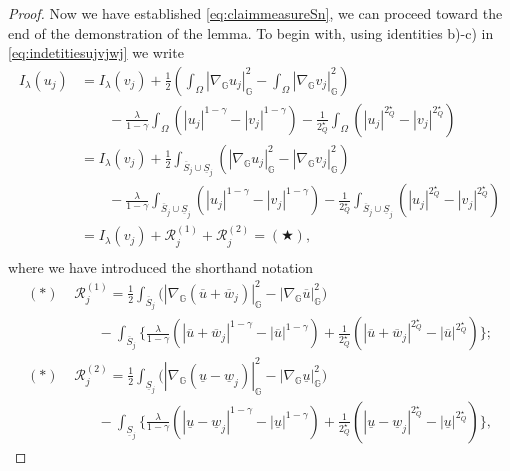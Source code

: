 \documentclass[11pt]{amsart}
\numberwithin{equation}{section} %
\theoremstyle{definition}
\begin{document}
\begin{proof}
	Now we have established \eqref{eq:claimmeasureSn}, we can proceed toward the end of the demonstration
	of the lemma.
	To begin with, using identities b)-c) in \eqref{eq:indetitiesujvjwj} we write
	\begin{align*}
		I_{\lambda}(u_j) & = I_{\lambda}(v_j)
		+ \frac{1}{2}\left(\int_{\Omega}|\nabla_{\mathbb{G}}u_j|_{\mathbb{G}}^2-\int_{\Omega}|\nabla_{\mathbb{G}}v_j|_{\mathbb{G}}^2\right) \\
		&\qquad-\frac{\lambda}{1-\gamma}\int_\Omega(|u_j|^{1-\gamma}-|v_j|^{1-\gamma}) 
		-\frac{1}{2^{\star}_{Q}}\int_\Omega(|u_j|^{2^{\star}_{Q}}-|v_j|^{2^{\star}_{Q}}) \\
		& = I_{\lambda}(v_j)
		+ \frac{1}{2}\int_{\overline{S}_j\cup\underline{S}_j}(|\nabla_{\mathbb{G}} u_j|_{\mathbb{G}}^2-|\nabla_{\mathbb{G}} v_j|_{\mathbb{G}}^2)\\
		&\qquad-\frac{\lambda}{1-\gamma}\int_{\overline{S}_j\cup\underline{S}_j}
		(|u_j|^{1-\gamma}-|v_j|^{1-\gamma}) 
		-\frac{1}{2^{\star}_{Q}}\int_{\overline{S}_j\cup\underline{S}_j}(|u_j|^{2^{\star}_{Q}}-|v_j|^{2^{\star}_{Q}}) \\
		& = I_{\lambda}(v_j) +
		\mathcal{R}^{(1)}_j+\mathcal{R}^{(2)}_j = (\bigstar), \phantom{+\int_{\underline{S}_j\cup\overline{S}_j}}
	\end{align*}
	where we have introduced the shorthand notation
	\begin{align*}
		(\ast)&\,\,\mathcal{R}^{(1)}_j = \frac{1}{2}\int_{\overline{S}_j}
		\big(|\nabla_{\mathbb{G}} (\overline{u}+\overline{w}_j)|_{\mathbb{G}}^2-|\nabla_{\mathbb{G}} \overline{u}|_{\mathbb{G}}^2\big) \\
		&\qquad - \int_{\overline{S}_j}
		\Big\{\frac{\lambda}{1-\gamma}(|\overline{u}+\overline{w}_j|^{1-\gamma}-|\overline{u}|^{1-\gamma})
		+\frac{1}{2^{\star}_{Q}}(|\overline{u}+\overline{w}_j|^{2^{\star}_{Q}}-|\overline{u}|^{2^{\star}_{Q}})\Big\}; \\[0.15cm]
		(\ast)&\,\,\mathcal{R}^{(2)}_j = \frac{1}{2}\int_{\underline{S}_j}
		\big(|\nabla_{\mathbb{G}} (\underline{u}-\underline{w}_j)|_{\mathbb{G}}^2-|\nabla_{\mathbb{G}} \underline{u}|_{\mathbb{G}}^2\big) \\
		& \qquad - \int_{\underline{S}_j}
		\Big\{\frac{\lambda}{1-\gamma}(|\underline{u}-\underline{w}_j|^{1-\gamma}-|\underline{u}|^{1-\gamma})
		+\frac{1}{2^{\star}_{Q}}(|\underline{u}-\underline{w}_j|^{2^{\star}_{Q}}-|\underline{u}|^{2^{\star}_{Q}})\Big\},
	\end{align*}

\end{proof}
\end{document}
